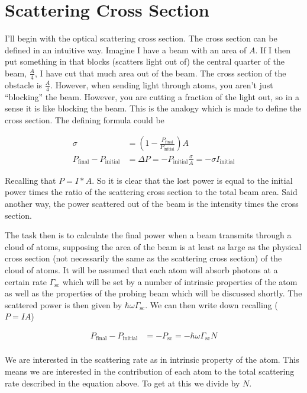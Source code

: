 \documentclass[12pt]{article}
\begin{document}
\section{Scattering Cross Section}

I'll begin with the optical scattering cross section. The cross section can be defined in an intuitive way. Imagine I have a beam with an area of $A$. If I then put something in that blocks (scatters light out of) the central quarter of the beam, $\frac{A}{4}$, I have cut that much area out of the beam. The cross section of the obstacle is $\frac{A}{4}$. However, when sending light through atoms, you aren't just ``blocking'' the beam. However, you are cutting a fraction of the light out, so in a sense it is like blocking the beam. This is the analogy which is made to define the cross section. The defining formula could be

\begin{align}
\sigma &= \left(1-\frac{P_\text{final}}{P_\text{initial}}\right) A\\
P_{\text{final}} - P_{\text{initial}} &= \Delta P = - P_{\text{initial}} \frac{\sigma}{A} = -\sigma I_{\text{initial}}
\end{align}

Recalling that $P = I*A$. So it is clear that the lost power is equal to the initial power times the ratio of the scattering cross section to the total beam area. Said another way, the power scattered out of the beam is the intensity times the cross section.

The task then is to calculate the final power when a beam transmits through a cloud of atoms, supposing the area of the beam is at least as large as the physical cross section (not necessarily the same as the scattering cross section) of the cloud of atoms.
It will be assumed that each atom will absorb photons at a certain rate $\Gamma_{\text{sc}}$ which will be set by a number of intrinsic properties of the atom as well as the properties of the probing beam which will be discussed shortly. The scattered power is then given by $\hbar \omega \Gamma_{\text{sc}}$. We can then write down recalling ($P=IA$)

\begin{align}
P_{\text{final}} - P_{\text{initial}} &= - P_{\text{sc}} =  -\hbar \omega \Gamma_{\text{sc}} N\\
\end{align}

We are interested in the scattering rate as in intrinsic property of the atom. This means we are interested in the contribution of each atom to the total scattering rate described in the equation above. To get at this we divide by $N$.
\end{document}
